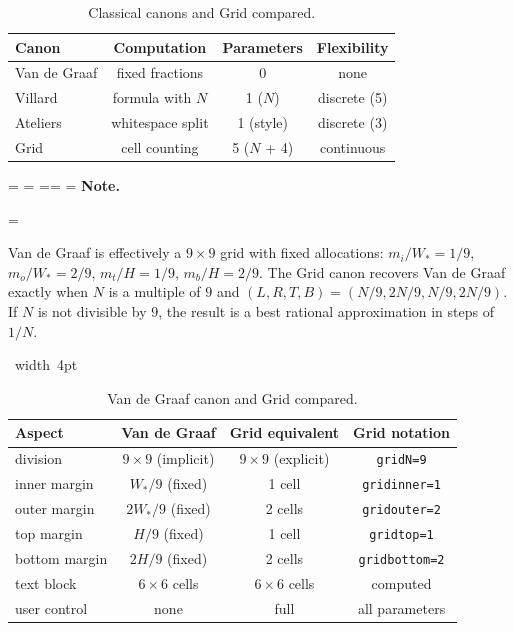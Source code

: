 \documentclass[11pt, twoside, openany]{book}
\makeatletter
\newcommand*{\cns@tag@artifact@begin}{}
\newcommand*{\cns@tag@artifact@end}{}
\newenvironment{TodoNote}[1][]{%
  \par\addvspace{0.5\baselineskip plus 2pt}%
  \setbox\cns@box=\vbox\bgroup
    \hsize=\linewidth
    \advance\hsize -10pt
    \linewidth=\hsize \columnwidth=\hsize
    \parindent=\z@
    \noindent\textbf{\sffamily Note\cns@ifnotempty{#1}{ \textmd{(#1)}}.}%
    \par\nobreak
    \@afterindentfalse\@afterheading
    \leftskip=\cns@indent\relax
    \ignorespaces
}{%
  \par
  \egroup
  \vbox{\hbox{%
    \cns@tag@artifact@begin\vrule width 4pt\cns@tag@artifact@end
    \hskip 6pt\relax
    \box\cns@box
  }}%
  \par\addvspace{0.5\baselineskip plus 2pt}%
}
\makeatother
\begin{document}
\begin{table}[h]
	\centering
	\caption{Classical canons and Grid compared.}
    \label{tab:superset}
	\begin{tabular}{@{}lccc@{}}
		\toprule
		\bfseries Canon & \bfseries Computation & \bfseries Parameters & \bfseries Flexibility \\
		\midrule
		Van de Graaf    & fixed fractions       & 0                    & none                  \\
		Villard         & formula with $N$      & 1 ($N$)              & discrete (5)          \\
		Ateliers        & whitespace split      & 1 (style)            & discrete (3)          \\
		Grid            & cell counting         & 5 ($N$ + 4)          & continuous            \\
		\bottomrule
	\end{tabular}
\end{table}

\begin{TodoNote}
	Van de Graaf is effectively a $9 \times 9$ grid with fixed allocations: $m_i/W_\ast=1/9$, $m_o/W_\ast=2/9$, $m_t/H=1/9$, $m_b/H=2/9$. The Grid canon recovers Van de Graaf exactly when $N$ is a multiple of $9$ and $(L,R,T,B) = (N/9, 2N/9, N/9, 2N/9)$. If $N$ is not divisible by $9$, the result is a best rational approximation in steps of $1/N$.
\end{TodoNote}

\begin{table}[h]
	\centering
	\caption{Van de Graaf canon and Grid compared.}
	\label{tab:vdggrid}
	\begin{tabular}{@{}lccc@{}}
		\toprule
		\bfseries Aspect & \bfseries Van de Graaf  & \bfseries Grid equivalent & \bfseries Grid notation \\
		\midrule
		division         & $9 \times 9$ (implicit) & $9 \times 9$ (explicit)   & \texttt{gridN=9}        \\
		inner margin     & $W_\ast/9$ (fixed)      & 1 cell                    & \texttt{gridinner=1}    \\
		outer margin     & $2W_\ast/9$ (fixed)     & 2 cells                   & \texttt{gridouter=2}    \\
		top margin       & $H/9$ (fixed)           & 1 cell                    & \texttt{gridtop=1}      \\
		bottom margin    & $2H/9$ (fixed)          & 2 cells                   & \texttt{gridbottom=2}   \\
		text block       & $6 \times 6$ cells      & $6 \times 6$ cells        & computed                \\
		user control     & none                    & full                      & all parameters          \\
		\bottomrule
	\end{tabular}
\end{table}
\end{document}
